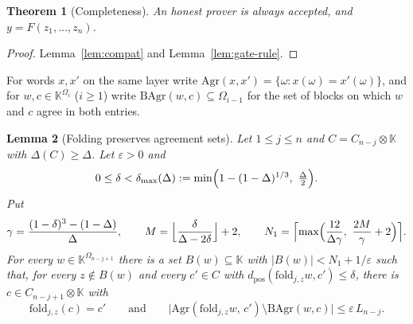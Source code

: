 \documentclass[11pt]{article}
\newtheorem{theorem}{Theorem}[section]
\newtheorem{lemma}[theorem]{Lemma}
\theoremstyle{definition}
\newcommand{\K}{\mathbb{K}}
\newcommand{\fold}{\mathrm{fold}}
\newcommand{\dpos}{d_{\mathrm{pos}}}
\begin{document}
\begin{theorem}[Completeness]
An honest prover is always accepted, and $y=F(z_1,\dots,z_n)$.
\end{theorem}
\begin{proof}
Lemma~\ref{lem:compat} and Lemma~\ref{lem:gate-rule}.
\end{proof}

For words $x,x'$ on the same layer write $\mathrm{Agr}(x,x')=\{\omega:x(\omega)=x'(\omega)\}$, and for
$w,c\in\K^{\Omega_i}$ ($i\ge1$) write $\mathrm{BAgr}(w,c)\subseteq\Omega_{i-1}$ for the set of blocks
on which $w$ and $c$ agree in both entries.

\begin{lemma}[Folding preserves agreement sets]\label{lem:agree}
Let $1\le j\le n$ and $C=C_{n-j}\otimes\K$ with $\Delta(C)\ge\Delta$. Let $\varepsilon>0$ and
\[
0\le\delta<\delta_{\max}(\Delta):=\min\Bigl(1-(1-\Delta)^{1/3},\ \tfrac{\Delta}{2}\Bigr).
\]
Put
\[
\gamma=\frac{(1-\delta)^3-(1-\Delta)}{\Delta},\qquad
M=\Bigl\lfloor\frac{\delta}{\Delta-2\delta}\Bigr\rfloor+2,\qquad
N_1=\Bigl\lceil\max\Bigl(\frac{12}{\Delta\gamma},\ \frac{2M}{\gamma}+2\Bigr)\Bigr\rceil.
\]
For every $w\in\K^{\Omega_{n-j+1}}$ there is a set $B(w)\subseteq\K$ with
$|B(w)|<N_1+1/\varepsilon$ such that, for every $z\notin B(w)$ and every $c'\in C$ with
$\dpos(\fold_{j,z}w,c')\le\delta$, there is $c\in C_{n-j+1}\otimes\K$ with
\[
\fold_{j,z}(c)=c'\qquad\text{and}\qquad
\bigl|\mathrm{Agr}(\fold_{j,z}w,\,c')\setminus\mathrm{BAgr}(w,c)\bigr|\le\varepsilon\,L_{n-j}.
\]
\end{lemma}
\end{document}
